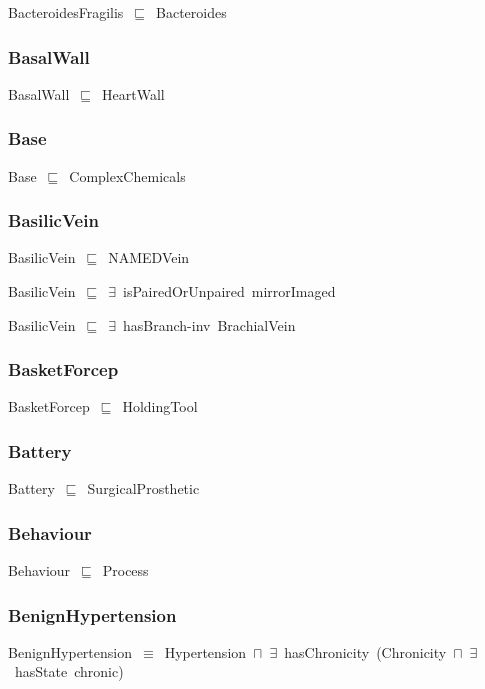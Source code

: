 \documentclass{article}
\begin{document}
BacteroidesFragilis~\ensuremath{\sqsubseteq}~Bacteroides~

\subsubsection*{BasalWall}

BasalWall~\ensuremath{\sqsubseteq}~HeartWall~

\subsubsection*{Base}

Base~\ensuremath{\sqsubseteq}~ComplexChemicals~

\subsubsection*{BasilicVein}

BasilicVein~\ensuremath{\sqsubseteq}~NAMEDVein~

BasilicVein~\ensuremath{\sqsubseteq}~\ensuremath{\exists}~isPairedOrUnpaired~mirrorImaged~

BasilicVein~\ensuremath{\sqsubseteq}~\ensuremath{\exists}~hasBranch-inv~BrachialVein~

\subsubsection*{BasketForcep}

BasketForcep~\ensuremath{\sqsubseteq}~HoldingTool~

\subsubsection*{Battery}

Battery~\ensuremath{\sqsubseteq}~SurgicalProsthetic~

\subsubsection*{Behaviour}

Behaviour~\ensuremath{\sqsubseteq}~Process~

\subsubsection*{BenignHypertension}

BenignHypertension~\ensuremath{\equiv}~Hypertension~\ensuremath{\sqcap}~\ensuremath{\exists}~hasChronicity~(Chronicity~\ensuremath{\sqcap}~\ensuremath{\exists}~hasState~chronic)
\end{document}

